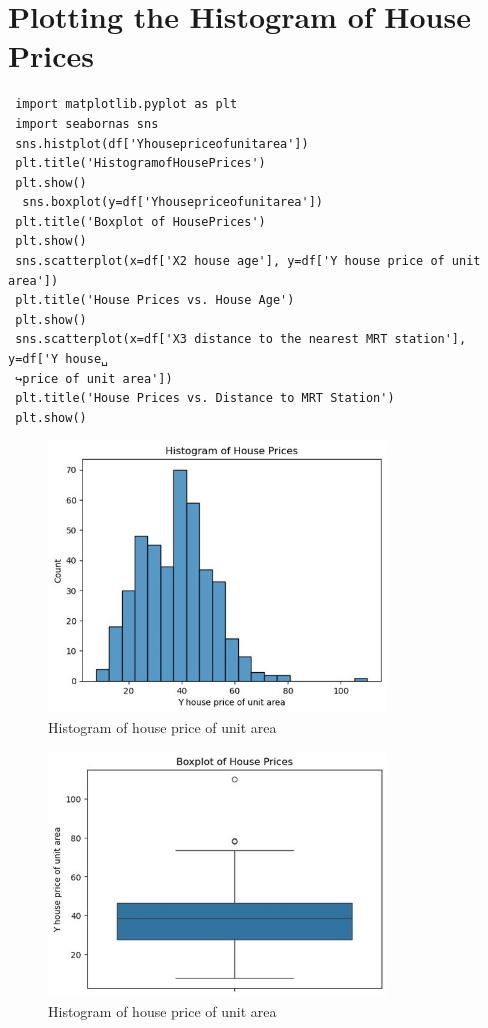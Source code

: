 \section{Plotting the Histogram of House Prices}
\begin{lstlisting}
 import matplotlib.pyplot as plt
 import seabornas sns
 sns.histplot(df['Yhousepriceofunitarea'])
 plt.title('HistogramofHousePrices')
 plt.show()
  sns.boxplot(y=df['Yhousepriceofunitarea'])
 plt.title('Boxplot of HousePrices')
 plt.show()
 sns.scatterplot(x=df['X2 house age'], y=df['Y house price of unit area'])
 plt.title('House Prices vs. House Age')
 plt.show()
 sns.scatterplot(x=df['X3 distance to the nearest MRT station'], y=df['Y house␣
 ↪price of unit area'])
 plt.title('House Prices vs. Distance to MRT Station')
 plt.show()
\end{lstlisting}
\vspace{-.75cm}
\begin{figure}[h!]
    \centering
    \includegraphics[width=0.8\textwidth]{histogram.png.jpg}
    \caption{Histogram of house price of unit area}
     \label{fig:histogram}
\end{figure}
\newpage
\begin{figure}[h!]
    \centering
    \includegraphics[width=0.8\textwidth]{boxplot.jpg}
    \caption{Histogram of house price of unit area}
     \label{fig:histogram}
\end{figure}
